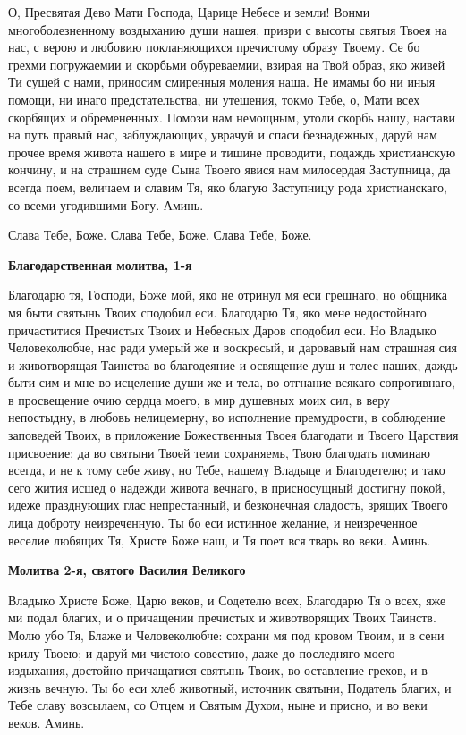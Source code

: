 О, Пресвятая Дево Мати Господа, Царице Небесе и земли! Вонми многоболезненному воздыханию души нашея, призри с высоты святыя Твоея на нас, с верою и любовию покланяющихся пречистому образу Твоему. Се бо грехми погружаемии и скорбьми обуреваемии, взирая на Твой образ, яко живей Ти сущей с нами, приносим смиренныя моления наша. Не имамы бо ни иныя помощи, ни инаго предстательства, ни утешения, токмо Тебе, о, Мати всех скорбящих и обремененных. Помози нам немощным, утоли скорбь нашу, настави на путь правый нас, заблуждающих, уврачуй и спаси безнадежных, даруй нам прочее время живота нашего в мире и тишине проводити, подаждь христианскую кончину, и на страшнем суде Сына Твоего явися нам милосердая Заступница, да всегда поем, величаем и славим Тя, яко благую Заступницу рода христианскаго, со всеми угодившими Богу. Аминь.

\mychapterending

 
Слава Тебе, Боже. Слава Тебе, Боже. Слава Тебе, Боже.


\medskip
\bfseries Благодарственная молитва, 1-я\normalfont{}


Благодарю тя, Господи, Боже мой, яко не отринул мя еси грешнаго, но общника мя быти святынь Твоих сподобил еси. Благодарю Тя, яко мене недостойнаго причаститися Пречистых Твоих и Небесных Даров сподобил еси. Но Владыко Человеколюбче, нас ради умерый же и воскресый, и даровавый нам страшная сия и животворящая Таинства во благодеяние и освящение душ и телес наших, даждь быти сим и мне во исцеление души же и тела, во отгнание всякаго сопротивнаго, в просвещение очию сердца моего, в мир душевных моих сил, в веру непостыдну, в любовь нелицемерну, во исполнение премудрости, в соблюдение заповедей Твоих, в приложение Божественныя Твоея благодати и Твоего Царствия присвоение; да во святыни Твоей теми сохраняемь, Твою благодать поминаю всегда, и не к тому себе живу, но Тебе, нашему Владыце и Благодетелю; и тако сего жития исшед о надежди живота вечнаго, в присносущный достигну покой, идеже празднующих глас непрестанный, и безконечная сладость, зрящих Твоего лица доброту неизреченную. Ты бо еси истинное желание, и неизреченное веселие любящих Тя, Христе Боже наш, и Тя поет вся тварь во веки. Аминь.


\medskip
\bfseries Молитва 2-я, святого Василия Великого\normalfont{}


Владыко Христе Боже, Царю веков, и Содетелю всех, Благодарю Тя о всех, яже ми подал благих, и о причащении пречистых и животворящих Твоих Таинств. Молю убо Тя, Блаже и Человеколюбче: сохрани мя под кровом Твоим, и в сени крилу Твоею; и даруй ми чистою совестию, даже до последняго моего издыхания, достойно причащатися святынь Твоих, во оставление грехов, и в жизнь вечную. Ты бо еси хлеб животный, источник святыни, Податель благих, и Тебе славу возсылаем, со Отцем и Святым Духом, ныне и присно, и во веки веков. Аминь.


